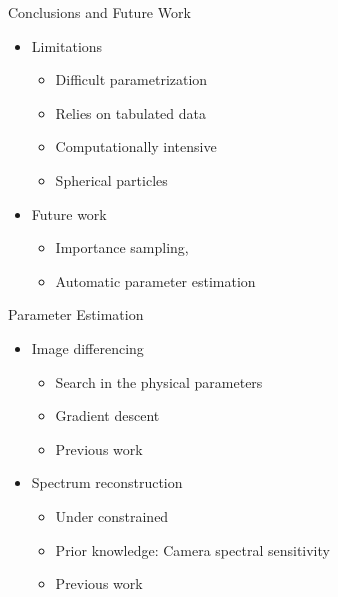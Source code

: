 \documentclass{beamer}
\begin{document}
\begin{frame}{Conclusions and Future Work}

\begin{itemize}
\setlength\itemsep{0.5em}
\item Limitations
	\begin{itemize}
	\setlength\itemsep{0.5em}
	\item Difficult parametrization
	\item Relies on tabulated data
	\item Computationally intensive
	\item Spherical particles
	\end{itemize}
\item Future work
	\begin{itemize}
	\setlength\itemsep{0.5em}
	\item Importance sampling,~\cite{Mizutani2014,Wang2014}
	\item Automatic parameter estimation
	\end{itemize}
\end{itemize}

\end{frame}

\begin{frame}{Parameter Estimation}

\begin{itemize}
\setlength\itemsep{0.5em}
\item Image differencing
	\begin{itemize}
	\setlength\itemsep{0.5em}
	\item Search in the physical parameters
	\item Gradient descent
	\item Previous work~\cite{Dobashi:2012}
	\end{itemize}
\item Spectrum reconstruction
	\begin{itemize}
	\setlength\itemsep{0.5em}
	\item Under constrained
	\item Prior knowledge: Camera spectral sensitivity
	\item Previous work~\cite{Smits:1999, Sun2001, Drew:2003}
	\end{itemize}
\end{itemize}

\end{frame}

\section*{}
\end{document}
